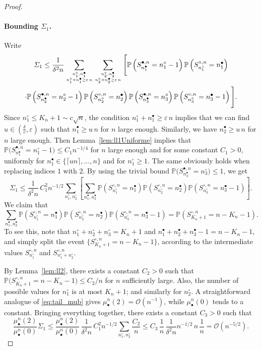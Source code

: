 \documentclass[AHL,XML,longabstracts,Unicode]{cedram}
\def\eps{\varepsilon}
\def\mubn{\mu_{\bullet}^{n}}
\def\Sbn{S^{\bullet,n}}
\def\Scn{S^{\circ,n}}
\renewcommand\Pr[1]{\mathbb{P}\left(#1\right)}
\newcommand\Prb[1]{\mathbb{P}\big(#1\big)}
\begin{document}
\begin{proof}
\paragraph*{Bounding $\varSigma_1$.} Write
  \begin{multline*}   \varSigma_1 \le \frac{1}{\delta^2 n}
  \sum_{n^\circ_1, n^\bullet_1 \atop n^\circ_1 + n^\bullet_1 \geq \eps\, n}
     \sum_{n^\circ_2, n^\bullet_2 \atop n^\circ_2 + n^\bullet_2 \geq \eps\, n}
     \Bigg[ \Pr{\Sbn_{n^\bullet_1}=n^\circ_1-1} \Pr{\Scn_{n^\circ_1}=n^\bullet_1} \\
     \cdot \Pr{\Sbn_{n^\bullet_2}=n^\circ_2-1} \Pr{\Scn_{n^\circ_2}=n^\bullet_2}
     \Pr{\Sbn_{n^\bullet_3}=n^\circ_3} \Pr{\Scn_{n^\circ_3}=n^\bullet_3-1} \Bigg].
   \end{multline*}
  Since $n^\circ_1 \le K_n+1 \sim c \sqrt{n}$, the condition $n^\circ_1 + n^\bullet_1 \geq \eps\, n$
  implies that we can find  $u \in (\tfrac{\delta}{c},\eps)$ such that  $n^\bullet_1 \geq u\, n$ for $n$ large enough.
  Similarly, we have $n^\bullet_2 \geq u\, n$ for $n$ large enough.
  Then Lemma~\ref{lem:ll1Uniforme} implies that
  $\Prb{\Sbn_{n^\bullet_1}=n^\circ_1-1} \le C_{1} n^{-1/4}$
  for $n$ large enough and for some constant $C_1>0$,
  uniformly for $n^\bullet_1 \in \{ \lceil un \rceil, \dots, n\}$ and for $n^\circ_1 \geq 1$.
  The same obviously holds when replacing indices $1$ with $2$.
By using the trivial bound $\Prb{\Sbn_{n^\bullet_3}=n^\circ_3} \le 1$, we get
  \[\varSigma_1 \le \frac{1}{\delta^2 n} \, C_{1}^2 n^{-1/2}
  \sum_{n^\circ_1, n^\circ_2}
  \left[ \sum_{n^\bullet_1, n^\bullet_2} \Pr{\Scn_{n^\circ_1}=n^\bullet_1}
  \Pr{\Scn_{n^\circ_2}=n^\bullet_2}
  \Pr{\Scn_{n^\circ_3}=n^\bullet_3-1} \right].
  \]
  We claim that
  \[
   \sum_{n^\bullet_1, n^\bullet_2} \Pr{\Scn_{n^\circ_1}=n^\bullet_1}
  \Pr{\Scn_{n^\circ_2}=n^\bullet_2}
  \Pr{\Scn_{n^\circ_3}=n^\bullet_3-1} =\Pr{\Scn_{K_n+1}=n-K_n-1}.\]
To see this, note that $n^\circ_1+n^\circ_2+n^\circ_3= K_n+1$ and $n^\bullet_1+n^\bullet_2+n^{\bullet}_{3}-1=n-K_{n}-1$,
and simply split the event $\{\Scn_{K_n+1}=n-K_n-1\}$,
  according to the intermediate values $\Scn_{n^\circ_1}$ and $\Scn_{n^\circ_1+n^\circ_2}$.


  By Lemma~\ref{lem:ll2}, there exists a constant $C_{2}>0$ such that  $\Prb{\Scn_{K_n+1}=n-K_n-1}   \leq C_{2}/n$ for $n$ sufficiently large. Also, the number of possible values for $n^\circ_1$ is at most $K_n+1$; and similarly for $n^\circ_2$.
  A straightforward analogue of \eqref{eq:tail_mub} gives $\mubn(2)=\mathcal O(n^{-1})$,
  while $\mubn(0)$ tends to a constant.
  Bringing everything together, there exists a constant $C_{3}>0$ such that
  \[ \frac{\mubn(2)}{\mubn(0)} \varSigma_1 \le  \frac{\mubn(2)}{\mubn(0)} \, \frac{1}{\delta^2 n} \, C_{1}^2 n^{-1/2}
  \sum_{n^\circ_1, n^\circ_2}
   \frac{C_{2}}{n}
 \le
 C_{3} \, \frac{1}{n} \, \frac{1}{\delta^2 n}  n^{-1/2}\,  n  \, \frac{1}{n}=\mathcal O(n^{-5/2}).\]


\end{proof}
\end{document}
